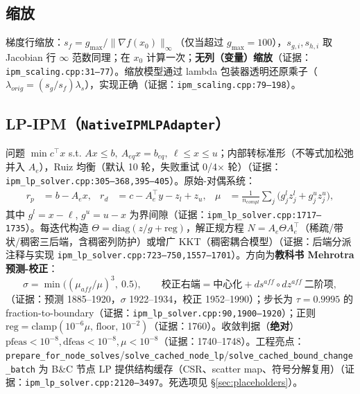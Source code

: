 \documentclass[11pt,a4paper]{ctexart}
\newcommand{\file}[1]{\texttt{#1}}
\newcommand{\func}[1]{\texttt{#1}}
\newcommand{\evid}[1]{{\footnotesize\color{black!70}（证据：#1）}}
\begin{document}
\subsection{缩放}
梯度行缩放：$s_f = g_{\max}/\|\nabla f(x_0)\|_\infty$（仅当超过 $g_{\max}{=}100$），$s_{g,i},s_{h,i}$ 取 Jacobian 行 $\infty$ 范数同理；在 $x_0$ 计算一次；\textbf{无列（变量）缩放}\evid{\file{ipm\_scaling.cpp:31--77}}。缩放模型通过 lambda 包装器透明还原乘子（$\lambda_{orig} = (s_g/s_f)\lambda_s$），实现正确\evid{\file{ipm\_scaling.cpp:79--198}}。

\subsection{LP-IPM（\func{NativeIPMLPAdapter}）}
问题 $\min c^{\top}x$ s.t. $Ax\le b,\ A_{eq}x=b_{eq},\ \ell\le x\le u$；内部转标准形（不等式加松弛并入 $A_e$），Ruiz 均衡（默认 10 轮，失败重试 0/4$\times$ 轮）\evid{\file{ipm\_lp\_solver.cpp:305--368,395--405}}。原始-对偶系统：
\begin{align}
r_p &= b - A_e x, & r_d &= c - A_e^{\top} y - z_l + z_u, &
\mu &= \tfrac{1}{n_{compl}}\sum_j\big(g^l_j z^l_j + g^u_j z^u_j\big),
\end{align}
其中 $g^l=x-\ell$, $g^u=u-x$ 为界间隙\evid{\file{ipm\_lp\_solver.cpp:1717--1735}}。每迭代构造 $\Theta = \mathrm{diag}(z/g+\mathrm{reg})$，解正规方程 $N = A_e\Theta A_e^{\top}$（稀疏/带状/稠密三后端，含稠密列防护）或增广 KKT（稠密耦合模型）\evid{后端分派注释与实现 \file{ipm\_lp\_solver.cpp:723--750,1557--1701}}。方向为\textbf{教科书 Mehrotra 预测-校正}：
\begin{equation}
\sigma = \min\big((\mu_{aff}/\mu)^3,\ 0.5\big),\qquad
\text{校正右端} = \text{中心化} + ds^{aff}\circ dz^{aff}\ \text{二阶项},
\end{equation}
\evid{预测 1885--1920，$\sigma$ 1922--1934，校正 1952--1990}；步长为 $\tau{=}0.9995$ 的 fraction-to-boundary\evid{\file{ipm\_lp\_solver.cpp:90,1900--1920}}；正则 $\mathrm{reg}=\mathrm{clamp}(10^{-6}\mu,\,\mathrm{floor},\,10^{-2})$\evid{1760}。收敛判据（\textbf{绝对}）$\mathrm{pfeas}{<}10^{-8},\mathrm{dfeas}{<}10^{-8},\mu{<}10^{-8}$\evid{1740--1748}。工程亮点：\func{prepare\_for\_node\_solves}/\func{solve\_cached\_node\_lp}/\func{solve\_cached\_bound\_change\_batch} 为 B\&C 节点 LP 提供结构缓存（CSR、scatter map、符号分解复用）\evid{\file{ipm\_lp\_solver.cpp:2120--3497}。死选项见 \S\ref{sec:placeholders}}。
\end{document}
